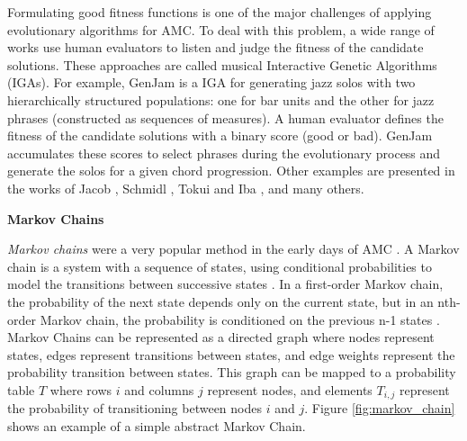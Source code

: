 Formulating good fitness functions is one of the major challenges of applying evolutionary algorithms for AMC. To deal with this problem, a wide range of works use human evaluators to listen and judge the fitness of the candidate solutions. These approaches are called musical Interactive Genetic Algorithms (IGAs). For example, GenJam \cite{biles1994genjam} is a IGA for generating jazz solos with two hierarchically structured populations: one for bar units and the other for jazz phrases (constructed as sequences of measures). A human evaluator defines the fitness of the candidate solutions with a binary score (good or bad). GenJam accumulates these scores to select phrases during the evolutionary process and generate the solos for a given chord progression. Other examples are presented in the works of Jacob \cite{jacob1995composing}, Schmidl \cite{schmidl2008pseudo}, Tokui and Iba \cite{tokui2000music},
and many others.

\vspace{0.1in}
\noindent
\textbf{Markov Chains}

\noindent
\textit{Markov chains} were a very popular method in the early days of AMC \cite{ames1989markov}.
A Markov chain is a system with a sequence of states, using conditional probabilities to model the transitions between successive states \cite{gillick2010machine}. In a first-order Markov chain, the probability of the next state depends only on the current state, but in an nth-order Markov chain, the probability is conditioned on the previous n-1 states \cite{gillick2010machine}. Markov Chains can be represented as a directed graph where nodes represent states, edges represent transitions between states, and edge weights represent the probability transition between states. This graph can be mapped to a probability table $T$ where rows $i$ and columns $j$ represent nodes, and elements $T_{i,j}$ represent the probability of transitioning between nodes $i$ and $j$. Figure \ref{fig:markov_chain} shows an example of a simple abstract Markov Chain.

